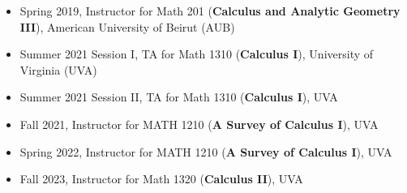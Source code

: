 \documentclass[margin, 10pt]{res} %
\begin{document}
\begin{resume}
\begin{itemize}
    \item Spring 2019, Instructor for Math 201 (\textbf{Calculus and Analytic Geometry III}), American University of Beirut (AUB)
    \item Summer 2021 Session I, TA for Math 1310 (\textbf{Calculus I}), University of Virginia (UVA)
    \item Summer 2021 Session II, TA for Math 1310 (\textbf{Calculus I}), UVA
    \item Fall 2021, Instructor for MATH 1210 (\textbf{A Survey of Calculus I}), UVA
    \item Spring 2022, Instructor for MATH 1210 (\textbf{A Survey of Calculus I}), UVA
    \item Fall 2023, Instructor for Math 1320 (\textbf{Calculus II}), UVA

\end{itemize}

\end{resume}
\end{document}
